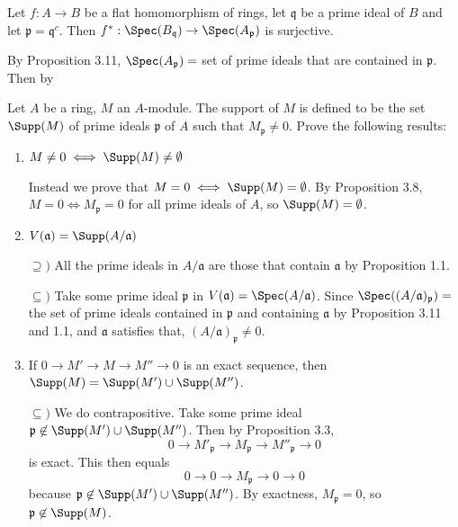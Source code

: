 \documentclass[a4paper]{exam}
\newif\ifhint
\begin{document}
\begin{questions}
\question Let $f: A\to B $ be a flat homomorphism of rings, let $\mathfrak{q} $ be a prime ideal of $B $ and let $\mathfrak{p} = \mathfrak{q}^c $. Then $f^\ast: \Spec(B_{\mathfrak{q}}) \to \Spec(A_{\mathfrak{p}}) $ is surjective.
\ifhint
	For $B_{\mathfrak{p}} $ is flat over $A_{\mathfrak{p}} $ by (3.10), and $B_{\mathfrak{q}} $ is a local ring of $B_{\mathfrak{p}} $, hence is flat over $B_{\mathfrak{p}} $. Hence $B_{\mathfrak{q}} $ is flat over $A_{\mathfrak{p}} $ and satisfies condition (3) of Exercise 16.
\fi
\begin{solution}
	By Proposition 3.11, $\Spec(A_{\mathfrak{p}}) = $ set of prime ideals that are contained in $\mathfrak{p} $.
	Then by 
\end{solution}

\question Let $A $ be a ring, $M $ an $A $-module. The support of $M $ is defined to be the set $\Supp(M)$ of prime ideals $\mathfrak{p} $ of $A $ such that $M_{\mathfrak{p}}\ne 0 $. Prove the following results:
\begin{enumerate}
	\item $M\ne 0 \iff \Supp(M) \ne \emptyset $
	\begin{solution}
		Instead we prove that $M = 0 \iff \Supp(M) = \emptyset $.
		By Proposition 3.8, $M = 0 \iff M_{\mathfrak{p}} = 0 $ for all prime ideals of $A $, so $\Supp(M) = \emptyset $.
	\end{solution}
	\item $V(\mathfrak{a}) = \Supp(A / \mathfrak{a}) $
	\begin{solution}
		$\supseteq) $ All the prime ideals in $A / \mathfrak{a} $ are those that contain $\mathfrak{a} $ by Proposition 1.1.

		$\subseteq) $ Take some prime ideal $\mathfrak{p} $ in $V(\mathfrak{a}) = \Spec(A / \mathfrak{a}) $.
		Since $\Spec((A / \mathfrak{a})_{\mathfrak{p}}) = $ the set of prime ideals contained in $\mathfrak{p} $ and containing $\mathfrak{a} $ by Proposition 3.11 and 1.1, and $\mathfrak{a} $ satisfies that, $(A / \mathfrak{a})_{\mathfrak{p}}\ne 0 $.
	\end{solution}
	\item If $0 \to M' \to M \to M'' \to 0 $ is an exact sequence, then $\Supp(M) = \Supp(M') \cup \Supp(M'') $.
	\begin{solution}
		$\subseteq) $ We do contrapositive.
		Take some prime ideal $\mathfrak{p} \not\in \Supp(M') \cup \Supp(M'') $.
		Then by Proposition 3.3,
		\[
			0 \to M'_{\mathfrak{p}} \to M_{\mathfrak{p}} \to M''_{\mathfrak{p}} \to 0
		\] 
		is exact.
		This then equals
		\[
			0 \to 0 \to M_{\mathfrak{p}} \to 0 \to 0
		\] 
		because $\mathfrak{p}\not\in \Supp(M') \cup \Supp(M'') $.
		By exactness, $M_{\mathfrak{p}} =0 $, so $\mathfrak{p} \not\in \Supp(M)$.


\end{solution}
\end{enumerate}
\end{questions}
\end{document}
